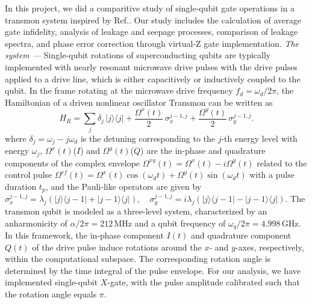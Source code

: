 \documentclass[twocolumn]{article}
\begin{document}
\newline \newline 
\noindent
In this project, we did a comparitive study of single-qubit gate operations in a transmon system inspired by Ref.\cite{ref1}. Our study includes the calculation of average gate infidelity, analysis of leakage and seepage processes, comparison of leakage spectra, and phase error correction through virtual-Z gate implementation.
\newline\newline 
\textit{The system ---} Single-qubit rotations of superconducting qubits are typically implemented with nearly resonant microwave drive pulses with the drive pulses applied to a drive line, which is either capacitively or inductively coupled to the qubit. In the frame rotating at the microwave drive frequency \( f_d = \omega_d/2\pi \), the Hamiltonian of a driven nonlinear oscillator Transmon\cite{ref2} can be written as \cite{ref1}
\begin{equation}
H_R = \sum_j \delta_j \, |j\rangle\langle j|
     + \frac{\Omega^x(t)}{2} \, \sigma_x^{j-1,j}
     + \frac{\Omega^y(t)}{2} \, \sigma_y^{j-1,j}.
\end{equation}
where \( \delta_j = \omega_j - j \omega_d \) is the detuning corresponding to the \( j \)-th energy level with energy \( \omega_j \), \(\Omega^x(t)\)(\( I\)) and \(\Omega^y(t)\)(\( Q\)) are the in-phase and quadrature components of the complex envelope \( \Omega^{xy}(t) = \Omega^x(t) - i\Omega^y(t) \) related to the control pulse \( \Omega^{rf}(t) = \Omega^x(t) \cos(\omega_d t) + \Omega^y(t) \sin(\omega_d t) \) with a pulse duration \( t_p \), and the Pauli-like operators are given by
\(
\sigma_x^{j-1,j} = \lambda_j (|j\rangle \langle j-1| + |j-1\rangle \langle j|), \quad \sigma_y^{j-1,j} = i \lambda_j (|j\rangle \langle j-1| - |j-1\rangle \langle j|).
\)
\newline \newline The transmon qubit is modeled as a three-level system, characterized by an anharmonicity of $\alpha/2\pi = 212\,\mathrm{MHz}$ and a qubit frequency of $\omega_q/2\pi = 4.998\,\mathrm{GHz}$. In this framework, the in-phase component $I(t)$ and quadrature component $Q(t)$ of the drive pulse induce rotations around the $x$- and $y$-axes, respectively, within the computational subspace. The corresponding rotation angle is determined by the time integral of the pulse envelope. For our analysis, we have implemented single-qubit $X$-gate, with the pulse amplitude calibrated such that the rotation angle equals $\pi$.
\end{document}
